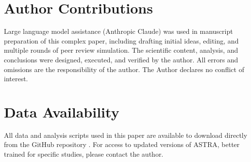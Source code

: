 \documentclass[usenatbib]{rasti}
\begin{document}
\section*{Author Contributions}

Large language model assistance (Anthropic Claude) was used in manuscript preparation of this complex paper, including drafting initial ideas, editing, and multiple rounds of peer review simulation. The scientific content, analysis, and conclusions were designed, executed, and verified by the author. All errors and omissions are the responsibility of the author. The Author declares no conflict of interest.

\section*{Data Availability}

All data and analysis scripts used in this paper are available to download directly from the GitHub repository \cite{astra_github}. For access to updated versions of ASTRA, better trained for specific studies, please contact the author.

\label{lastpage}



\end{document}
